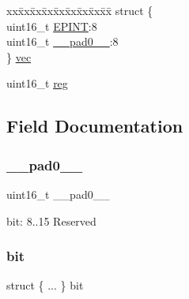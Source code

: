 \begin{DoxyCompactItemize}
\begin{tabbing}
\end{tabbing}\item 
\begin{tabbing}
xx\=xx\=xx\=xx\=xx\=xx\=xx\=xx\=xx\=\kill
struct \{\\
\>uint16\_t \mbox{\hyperlink{union_u_s_b___h_o_s_t___p_i_n_t_s_m_r_y___type_aafe68bdeddb72ad86b0864415e51d236}{EPINT}}:8\\
\>uint16\_t \mbox{\hyperlink{union_u_s_b___h_o_s_t___p_i_n_t_s_m_r_y___type_a77132c2c26a75f5b8751b235cda23828}{\_\_pad0\_\_}}:8\\
\} \mbox{\hyperlink{union_u_s_b___h_o_s_t___p_i_n_t_s_m_r_y___type_a428522b272f72290913d99db1fdbbfd7}{vec}}\\

\end{tabbing}\item 
uint16\+\_\+t \mbox{\hyperlink{union_u_s_b___h_o_s_t___p_i_n_t_s_m_r_y___type_a11760f5020019f4aa8cb02e694f7cc44}{reg}}
\end{DoxyCompactItemize}


\subsection{Field Documentation}
\mbox{\label{union_u_s_b___h_o_s_t___p_i_n_t_s_m_r_y___type_a77132c2c26a75f5b8751b235cda23828}} 
\subsubsection{\texorpdfstring{\_\_pad0\_\_}{\_\_pad0\_\_}}
{\footnotesize\ttfamily uint16\+\_\+t \+\_\+\+\_\+pad0\+\_\+\+\_\+}

bit\+: 8..15 Reserved \mbox{\label{union_u_s_b___h_o_s_t___p_i_n_t_s_m_r_y___type_afa59f61f9eafe368f67aa4272ffe3743}} 
\subsubsection{\texorpdfstring{bit}{bit}}
{\footnotesize\ttfamily struct \{ ... \}   bit}

